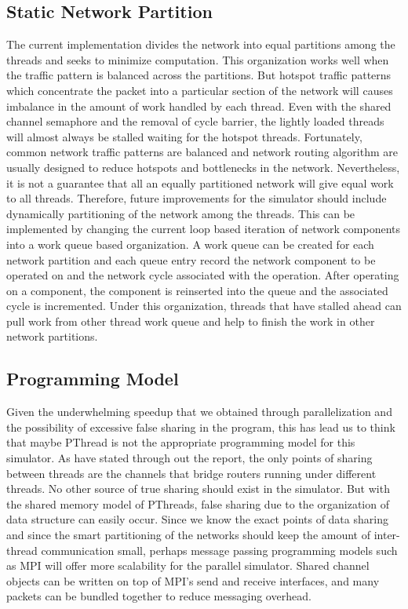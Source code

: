 

\subsection{Static Network Partition}
The current implementation divides the network into equal partitions among the threads and seeks to minimize computation. This organization works well when the traffic pattern is balanced across the partitions. But hotspot traffic patterns which concentrate the packet into a particular section of the network will causes imbalance in the amount of work handled by each thread. Even with the shared channel semaphore and the removal of cycle barrier, the lightly loaded threads will almost always be stalled waiting for the hotspot threads. Fortunately, common network traffic patterns are balanced and network routing algorithm are usually designed to reduce hotspots and bottlenecks in the network. Nevertheless, it is not a guarantee that all an equally partitioned network will give equal work to all threads. Therefore, future improvements for the simulator should include dynamically partitioning of the network among the threads. This can be implemented by changing the current loop based iteration of network components into a work queue based organization. A work queue can be created for each network partition and each queue entry record the network component to be operated on and the network cycle associated with the operation. After operating on a component, the component is reinserted into the queue and the associated cycle is incremented. Under this organization, threads that have stalled ahead can pull work from other thread work queue and help to finish the work in other network partitions.  

\subsection{Programming Model}
Given the underwhelming speedup that we obtained through parallelization and the possibility of excessive false sharing in the program, this has lead us to think that maybe PThread is not the appropriate programming model for this simulator. As have stated through out the report, the only points of sharing between threads are the channels that bridge routers running under different threads. No other source of true sharing should exist in the simulator. But with the shared memory model of PThreads, false sharing due to the organization of data structure can easily occur. Since we know the exact points of data sharing and since the smart partitioning of the networks should keep the amount of inter-thread communication small, perhaps message passing programming models such as MPI will offer more scalability for the parallel simulator. Shared channel objects can be written on top of MPI's send and receive interfaces, and many packets can be bundled together to reduce messaging overhead. 

